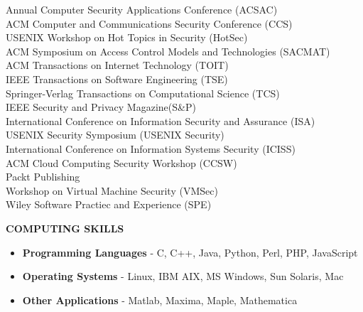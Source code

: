 \documentclass[10pt]{article}
\begin{document}
\begin{itemize}
    Annual Computer Security Applications Conference (ACSAC)\\
    ACM Computer and Communications Security Conference (CCS)\\
    USENIX Workshop on Hot Topics in Security (HotSec)\\
    ACM Symposium on Access Control Models and Technologies (SACMAT)\\
    ACM Transactions on Internet Technology (TOIT)\\
    IEEE Transactions on Software Engineering (TSE)\\
    Springer-Verlag Transactions on Computational Science (TCS)\\
    IEEE Security and Privacy Magazine(S\&P)\\
    International Conference on Information Security and Assurance (ISA)\\
    USENIX Security Symposium (USENIX Security)\\
    International Conference on Information Systems Security (ICISS)\\
    ACM Cloud Computing Security Workshop (CCSW)\\
    Packt Publishing\\
    Workshop on Virtual Machine Security (VMSec)\\
    Wiley Software Practiec and Experience (SPE)

\end{itemize}

\vspace{1em} {\Large \textbf{COMPUTING SKILLS}}
\begin{itemize}
\item \textbf{Programming Languages} - C, C++, Java, Python, Perl, PHP, JavaScript
\item \textbf{Operating Systems} - Linux, IBM AIX, MS Windows, Sun Solaris, Mac
\item \textbf{Other Applications} - Matlab, Maxima, Maple, Mathematica

\end{itemize}
\end{document}
